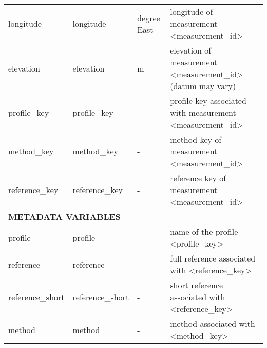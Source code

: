 \begin{table}[t]
\begin{tabular}{|llll|}
\multicolumn{1}{|l|}{longitude} &
  \multicolumn{1}{l|}{longitude} &
  \multicolumn{1}{l|}{degree East} &
  longitude of measurement \textless{}measurement\_id\textgreater{} \\ 
\multicolumn{1}{|l|}{elevation} &
  \multicolumn{1}{l|}{elevation} &
  \multicolumn{1}{l|}{m} &
  elevation of measurement \textless{}measurement\_id\textgreater (datum may vary) \\ 
\multicolumn{1}{|l|}{profile\_key} &
  \multicolumn{1}{l|}{profile\_key} &
  \multicolumn{1}{l|}{-} &
  profile key associated with measurement \textless{}measurement\_id\textgreater{} \\ 
\multicolumn{1}{|l|}{method\_key} &
  \multicolumn{1}{l|}{method\_key} &
  \multicolumn{1}{l|}{-} &
  method key of measurement \textless{}measurement\_id\textgreater{} \\ 
\multicolumn{1}{|l|}{reference\_key} &
  \multicolumn{1}{l|}{reference\_key} &
  \multicolumn{1}{l|}{-} &
  reference key of measurement \textless{}measurement\_id\textgreater{} \\ \hline
  
\multicolumn{4}{|l|}{\textbf{METADATA VARIABLES}} \\ \hline
\multicolumn{1}{|l|}{profile} &
  \multicolumn{1}{l|}{profile} &
  \multicolumn{1}{l|}{-} &
  name of the profile \textless{}profile\_key\textgreater{} \\ 
\multicolumn{1}{|l|}{reference} &
  \multicolumn{1}{l|}{reference} &
  \multicolumn{1}{l|}{-} &
  full reference associated with \textless{}reference\_key\textgreater \\ 
\multicolumn{1}{|l|}{reference\_short} &
  \multicolumn{1}{l|}{reference\_short} &
  \multicolumn{1}{l|}{-} &
  short reference associated with \textless{}reference\_key\textgreater \\ 
\multicolumn{1}{|l|}{method} &
  \multicolumn{1}{l|}{method} &
  \multicolumn{1}{l|}{-} &
  method associated with \textless{}method\_key\textgreater{} \\ \hline
\end{tabular}
\end{table}